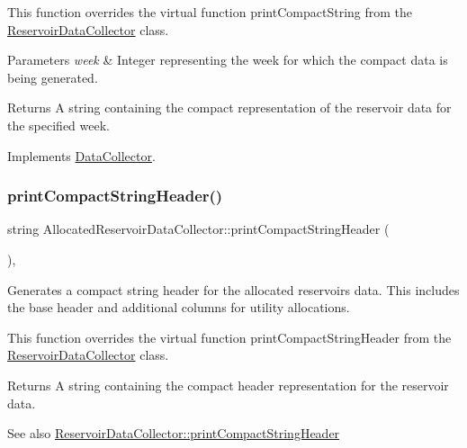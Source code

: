 This function overrides the virtual function {\ttfamily print\+Compact\+String} from the {\ttfamily \mbox{\hyperlink{classReservoirDataCollector}{Reservoir\+Data\+Collector}}} class.


\begin{DoxyParams}{Parameters}
{\em week} & Integer representing the week for which the compact data is being generated.\\
\hline
\end{DoxyParams}
\begin{DoxyReturn}{Returns}
A string containing the compact representation of the reservoir data for the specified week. 
\end{DoxyReturn}


Implements \mbox{\hyperlink{classDataCollector_a2eac264fa5612aed5a830b12de4f4ae3}{Data\+Collector}}.

\mbox{\label{classAllocatedReservoirDataCollector_adbedebdf593bee81447671fb8f6ef2fe}} 
\subsubsection{\texorpdfstring{print\+Compact\+String\+Header()}{printCompactStringHeader()}}
{\footnotesize\ttfamily string Allocated\+Reservoir\+Data\+Collector\+::print\+Compact\+String\+Header (\begin{DoxyParamCaption}{ }\end{DoxyParamCaption})\hspace{0.3cm}{\ttfamily [override]}, {\ttfamily [virtual]}}



Generates a compact string header for the allocated reservoir\textquotesingle{}s data. This includes the base header and additional columns for utility allocations. 

This function overrides the virtual function {\ttfamily print\+Compact\+String\+Header} from the {\ttfamily \mbox{\hyperlink{classReservoirDataCollector}{Reservoir\+Data\+Collector}}} class.

\begin{DoxyReturn}{Returns}
A string containing the compact header representation for the reservoir data.
\end{DoxyReturn}
\begin{DoxySeeAlso}{See also}
\mbox{\hyperlink{classReservoirDataCollector_aa8346433f037bbca41f3c8450f7f88cf}{Reservoir\+Data\+Collector\+::print\+Compact\+String\+Header}} 
\end{DoxySeeAlso}


